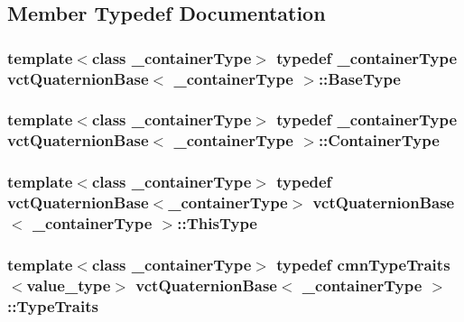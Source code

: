 \subsection{Member Typedef Documentation}
\hypertarget{classvct_quaternion_base_a342c9d5a6e43b2e9e5325edcb5ebadbc}{
\subsubsection[{Base\-Type}]{\setlength{\rightskip}{0pt plus 5cm}template$<$class \-\_\-container\-Type$>$ typedef \-\_\-container\-Type {\bf vct\-Quaternion\-Base}$<$ \-\_\-container\-Type $>$\-::{\bf Base\-Type}}}\label{classvct_quaternion_base_a342c9d5a6e43b2e9e5325edcb5ebadbc}
\hypertarget{classvct_quaternion_base_ad9916f63417895bf3ac6ad6cd753cb47}{
\subsubsection[{Container\-Type}]{\setlength{\rightskip}{0pt plus 5cm}template$<$class \-\_\-container\-Type$>$ typedef \-\_\-container\-Type {\bf vct\-Quaternion\-Base}$<$ \-\_\-container\-Type $>$\-::{\bf Container\-Type}}}\label{classvct_quaternion_base_ad9916f63417895bf3ac6ad6cd753cb47}
\hypertarget{classvct_quaternion_base_af28efdc38acf89acb7a67afada11408c}{
\subsubsection[{This\-Type}]{\setlength{\rightskip}{0pt plus 5cm}template$<$class \-\_\-container\-Type$>$ typedef {\bf vct\-Quaternion\-Base}$<$\-\_\-container\-Type$>$ {\bf vct\-Quaternion\-Base}$<$ \-\_\-container\-Type $>$\-::{\bf This\-Type}}}\label{classvct_quaternion_base_af28efdc38acf89acb7a67afada11408c}
\hypertarget{classvct_quaternion_base_a4c70fa57d856488a018b94b70d61b25c}{
\subsubsection[{Type\-Traits}]{\setlength{\rightskip}{0pt plus 5cm}template$<$class \-\_\-container\-Type$>$ typedef {\bf cmn\-Type\-Traits}$<$value\-\_\-type$>$ {\bf vct\-Quaternion\-Base}$<$ \-\_\-container\-Type $>$\-::{\bf Type\-Traits}}}\label{classvct_quaternion_base_a4c70fa57d856488a018b94b70d61b25c}


